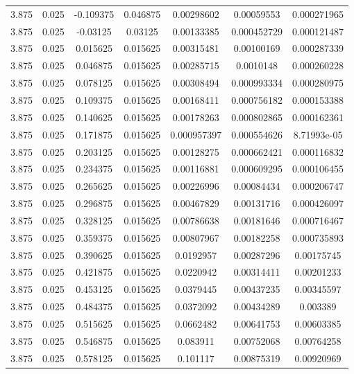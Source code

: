 \begin{table}[bh]
\begin{center}
{\begin{tabular}{ccccccc}
3.875	 & 0.025 & 	-0.109375	 & 0.046875	 & 0.00298602	 & 0.00059553	 & 0.000271965 \\ 
3.875	 & 0.025 & 	-0.03125	 & 0.03125	 & 0.00133385	 & 0.000452729	 & 0.000121487 \\ 
3.875	 & 0.025 & 	0.015625	 & 0.015625	 & 0.00315481	 & 0.00100169	 & 0.000287339 \\ 
3.875	 & 0.025 & 	0.046875	 & 0.015625	 & 0.00285715	 & 0.0010148	 & 0.000260228 \\ 
3.875	 & 0.025 & 	0.078125	 & 0.015625	 & 0.00308494	 & 0.000993334	 & 0.000280975 \\ 
3.875	 & 0.025 & 	0.109375	 & 0.015625	 & 0.00168411	 & 0.000756182	 & 0.000153388 \\ 
3.875	 & 0.025 & 	0.140625	 & 0.015625	 & 0.00178263	 & 0.000802865	 & 0.000162361 \\ 
3.875	 & 0.025 & 	0.171875	 & 0.015625	 & 0.000957397	 & 0.000554626	 & 8.71993e-05 \\ 
3.875	 & 0.025 & 	0.203125	 & 0.015625	 & 0.00128275	 & 0.000662421	 & 0.000116832 \\ 
3.875	 & 0.025 & 	0.234375	 & 0.015625	 & 0.00116881	 & 0.000609295	 & 0.000106455 \\ 
3.875	 & 0.025 & 	0.265625	 & 0.015625	 & 0.00226996	 & 0.00084434	 & 0.000206747 \\ 
3.875	 & 0.025 & 	0.296875	 & 0.015625	 & 0.00467829	 & 0.00131716	 & 0.000426097 \\ 
3.875	 & 0.025 & 	0.328125	 & 0.015625	 & 0.00786638	 & 0.00181646	 & 0.000716467 \\ 
3.875	 & 0.025 & 	0.359375	 & 0.015625	 & 0.00807967	 & 0.00182258	 & 0.000735893 \\ 
3.875	 & 0.025 & 	0.390625	 & 0.015625	 & 0.0192957	 & 0.00287296	 & 0.00175745 \\ 
3.875	 & 0.025 & 	0.421875	 & 0.015625	 & 0.0220942	 & 0.00314411	 & 0.00201233 \\ 
3.875	 & 0.025 & 	0.453125	 & 0.015625	 & 0.0379445	 & 0.00437235	 & 0.00345597 \\ 
3.875	 & 0.025 & 	0.484375	 & 0.015625	 & 0.0372092	 & 0.00434289	 & 0.003389 \\ 
3.875	 & 0.025 & 	0.515625	 & 0.015625	 & 0.0662482	 & 0.00641753	 & 0.00603385 \\ 
3.875	 & 0.025 & 	0.546875	 & 0.015625	 & 0.083911	 & 0.00752068	 & 0.00764258 \\ 
3.875	 & 0.025 & 	0.578125	 & 0.015625	 & 0.101117	 & 0.00875319	 & 0.00920969 \\ 

\end{tabular}}
\end{center}
\end{table}
